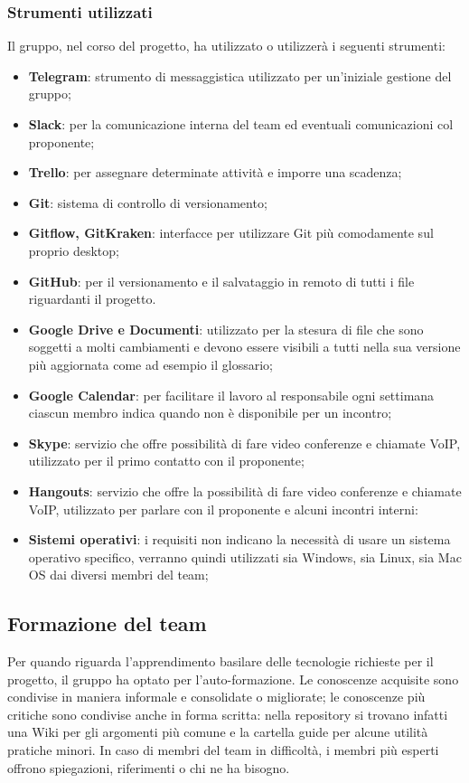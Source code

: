 		\subsubsection{Strumenti utilizzati}
		Il gruppo, nel corso del progetto, ha utilizzato o utilizzerà i seguenti strumenti:
		\begin{itemize}
			\item \textbf{Telegram}: strumento di messaggistica utilizzato per un'iniziale gestione del gruppo;
			\item \textbf{Slack}: per la comunicazione interna del team ed eventuali comunicazioni col proponente;
			\item \textbf{Trello}: per assegnare determinate attività e imporre una scadenza;
			\item \textbf{Git}: sistema di controllo di versionamento;
			\item \textbf{Gitflow, GitKraken}: interfacce per utilizzare Git più comodamente sul proprio desktop;
			\item \textbf{GitHub}: per il versionamento e il salvataggio in remoto di tutti i file riguardanti il progetto.
			\item \textbf{Google Drive e Documenti}: utilizzato per la stesura di file che sono soggetti a molti cambiamenti e devono essere visibili a tutti nella sua versione più aggiornata come ad esempio il glossario;
			\item \textbf{Google Calendar}: per facilitare il lavoro al responsabile ogni settimana ciascun membro indica quando non è disponibile per un incontro;
			\item \textbf{Skype}: servizio che offre possibilità di fare video conferenze e chiamate VoIP, utilizzato per il primo contatto con il proponente;
			\item \textbf{Hangouts}: servizio che offre la possibilità di fare video conferenze e chiamate VoIP, utilizzato per parlare con il proponente e alcuni incontri interni:
			\item \textbf{Sistemi operativi}: i requisiti non indicano la necessità di usare un sistema operativo specifico, verranno quindi utilizzati sia Windows, sia Linux, sia Mac OS dai diversi membri del team; %
		\end{itemize}
	\subsection{Formazione del team}
	Per quando riguarda l'apprendimento basilare delle tecnologie richieste per il progetto, il gruppo ha optato per l'auto-formazione. Le conoscenze acquisite sono condivise in maniera informale e consolidate o migliorate; le conoscenze più critiche sono condivise anche in forma scritta: nella repository si trovano infatti una Wiki per gli argomenti più comune e la cartella guide per alcune utilità pratiche minori. In caso di membri del team in difficoltà, i membri più esperti offrono spiegazioni, riferimenti o chi ne ha bisogno.			